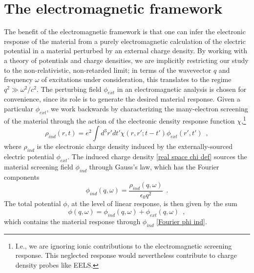 \documentclass[submission, Phys]{SciPost}
\newcommand{\e}{\epsilon}
\begin{document}
\section{The electromagnetic framework}
\label{section: electromagnetic framework}

The benefit of the electromagnetic framework is that one can infer the electronic response of the material from a purely electromagnetic calculation of the electric potential in a material perturbed by an external charge density.  By working with a theory of potentials and charge densities, we are implicitly restricting our study to the non-relativistic, non-retarded limit; in terms of the wavevector $q$ and frequency $\omega$ of excitations under consideration, this translates to the regime $q^2\gg \omega^2/c^2$.  The perturbing field $\phi_{ext}$ in an electromagnetic analysis is chosen for convenience, since its role is to generate the desired material response.  Given a particular $\phi_{ext}$, we work backwards by characterizing the many-electron screening of the material through the action of the electronic density response function $\chi$,\footnote{I.e., we are ignoring ionic contributions to the electromagnetic screening response.  This neglected response would nevertheless contribute to charge density probes like EELS.}
\begin{equation}
    \label{real space chi def}
    \rho_{ind}(r,t) = e^2\int d^3 r' dt' \chi(r,r';t-t')\phi_{ext}(r',t')
    \,\,\,,
\end{equation}
where $\rho_{ind}$ is the electronic charge density induced by the externally-sourced electric potential $\phi_{ext}$.  The induced charge density \eqref{real space chi def} sources the material screening field $\phi_{ind}$ through Gauss's law, which has the Fourier components
\begin{equation}
    \label{Fourier phi ind}
    \phi_{ind}(q,\omega) = \frac{\rho_{ind}(q,\omega)}{\e_0 q^2}
    \,\,\,.
\end{equation}
The total potential $\phi$, at the level of linear response, is then given by the sum
\begin{equation}
    \label{phi def}
    \phi(q,\omega) = \phi_{ind}(q,\omega) + \phi_{ext}(q,\omega)
    \,\,\,,
\end{equation}
which contains the material response through $\phi_{ind}$ \eqref{Fourier phi ind}.  
\end{document}
